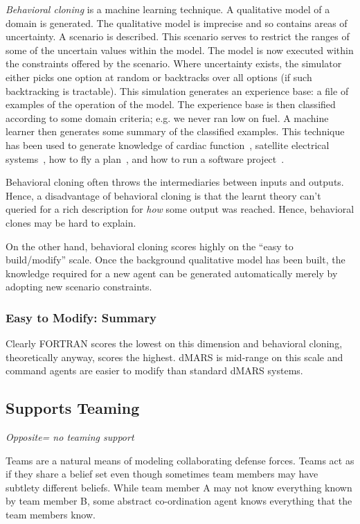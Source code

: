 {\em Behavioral cloning} is a machine learning technique. A
qualitative model of a domain is generated. The qualitative model
is imprecise and so contains areas of uncertainty.  A scenario is
described. This scenario serves to restrict the ranges of some of
the uncertain values within the model. The model is now executed
within the constraints offered by the scenario. Where uncertainty
exists, the simulator either picks one option at random or
backtracks over all options (if such backtracking is tractable).
This simulation generates an experience base: a file of examples
of the operation of the model. The experience base is then
classified according to some domain criteria; e.g. we never ran
low on fuel. A machine learner then generates some summary of the
classified examples. This technique has been used to generate
knowledge of cardiac function~\cite{bratko89},  satellite
electrical systems~\cite{pearce88}, how to fly a
plan~\cite{sammut92}, and how to run a software
project~\cite{me00a}.

Behavioral cloning often throws the   intermediaries between
inputs and outputs. Hence, a disadvantage of behavioral cloning is
that the learnt theory can't queried for a rich description for
{\em how} some output was reached. Hence, behavioral clones may be
hard to explain.

On the other hand,   behavioral cloning scores highly on the
``easy to build/modify'' scale. Once the background qualitative
model has been built, the knowledge required for a new agent can
be generated automatically merely by adopting new scenario
constraints.

\subsubsection{Easy to Modify: Summary}

Clearly FORTRAN scores the lowest on this dimension and behavioral cloning,
theoretically anyway, scores the highest. dMARS is mid-range on this scale and
command agents are easier to modify than standard dMARS systems.

\subsection{Supports Teaming}

{\em Opposite= no teaming support}

Teams  are a natural means of modeling collaborating defense
forces. Teams act as if they share a belief set even though
sometimes team members may have subtlety different beliefs. While
team member A may not know everything known by team member B, some
abstract co-ordination agent knows everything that the team
members know.


